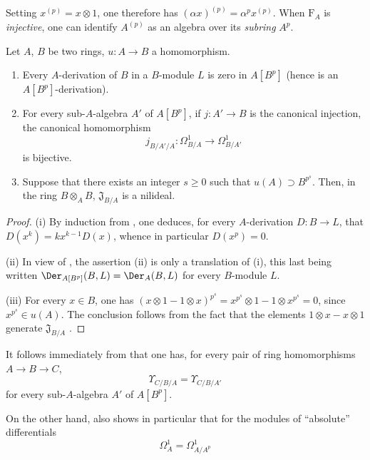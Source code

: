Setting $x^{(p)}=x\otimes 1$, one therefore has $(\alpha x)^{(p)}=\alpha^p x^{(p)}$.
When $\mathrm{F}_A$ is \emph{injective}, one can identify $A^{(p)}$ as an algebra over its \emph{subring} $A^p$.

\begin{proposition}[21.1.5]
\label{0.21.1.5}
Let $A$, $B$ be two rings, $u:A\to B$ a homomorphism.
\begin{enumerate}
  \item[\rm(i)] Every $A$-derivation of $B$ in a $B$-module $L$ is zero in $A[B^p]$ \textup{(}hence is an $A[B^p]$-derivation\textup{)}.
  \item[\rm(ii)] For every sub-$A$-algebra $A'$ of $A[B^p]$, if $j:A'\to B$ is the canonical injection, the canonical homomorphism
\[
  j_{B/A'/A}:\Omega^1_{B/A}\to\Omega^1_{B/A'}
\]
is bijective.
  \item[\rm(iii)] Suppose that there exists an integer $s\geq 0$ such that $u(A)\supset B^{p^s}$.
  Then, in the ring $B\otimes_A B$, $\mathfrak{J}_{B/A}$ is a nilideal.
\end{enumerate}
\end{proposition}

\begin{proof}
(i) By induction from , one deduces, for every $A$-derivation $D:B\to L$, that $D(x^k)=kx^{k-1}D(x)$, whence in particular $D(x^p)=0$.

(ii) In view of , the assertion (ii) is only a translation of (i), this last being written $\Der_{A[B^p]}(B,L)=\Der_A(B,L)$ for every $B$-module $L$.

(iii) For every $x\in B$, one has $(x\otimes 1-1\otimes x)^{p^s}=x^{p^s}\otimes 1-1\otimes x^{p^s}=0$, since $x^{p^s}\in u(A)$.
The conclusion follows from the fact that the elements $1\otimes x-x\otimes 1$ generate $\mathfrak{J}_{B/A}$ .
\end{proof}

It follows immediately from  that one has, for every pair of ring homomorphisms $A\to B\to C$,
\begin{equation}
\tag{21.1.5.1}
  \label{0.21.1.5.1}
  \Upsilon_{C/B/A}=\Upsilon_{C/B/A'}
\end{equation}
for every sub-$A$-algebra $A'$ of $A[B^p]$.

On the other hand,  also shows in particular that for the modules of ``absolute'' differentials
\begin{equation}
\tag{21.1.5.2}
  \label{0.21.1.5.2}
  \Omega^1_A=\Omega^1_{A/A^p}
\end{equation}


